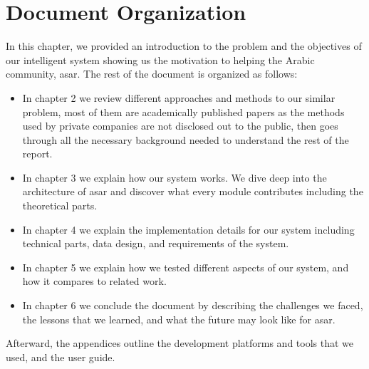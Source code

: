 \section{Document Organization}
In this chapter, we provided an introduction to the problem and the objectives of our intelligent system showing us the motivation to helping the Arabic community, \acrshort{asar}. The rest of the document is organized as follows:
\begin{itemize}[itemsep=1pt, topsep=5pt]
    \item In chapter 2 we review different approaches and methods to our similar problem, most of them are academically published papers as the methods used by private companies are not disclosed out to the public, then goes through all the necessary background needed to understand the rest of the report.
    \item In chapter 3 we explain how our system works. We dive deep into the architecture of \acrshort{asar} and discover what every module contributes including the theoretical parts.
    \item In chapter 4 we explain the implementation details for our system including technical parts, data design, and requirements of the system.
    \item In chapter 5 we explain how we tested different aspects of our system, and how it compares to related work.
    \item In chapter 6 we conclude the document by describing the challenges we faced, the lessons that we learned, and what the future may look like for \acrshort{asar}.
\end{itemize}

Afterward, the appendices outline the development platforms and tools that we used, and the user guide.
